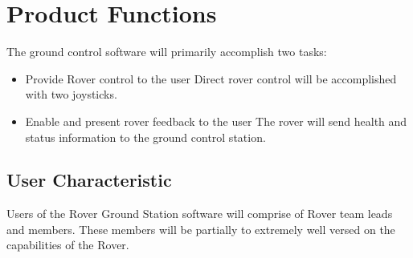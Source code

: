 \documentclass[onecolumn, draftclsnofoot, 10pt, compsoc]{IEEEtran}
\begin{document}
\section{Product Functions}
The ground control software will primarily accomplish two tasks:
\begin{itemize}
\item Provide Rover control to the user
Direct rover control will be accomplished with two joysticks.
\item Enable and present rover feedback to the user
The rover will send health and status information to the ground control station.
\end{itemize}
\subsection{User Characteristic}
Users of the Rover Ground Station software will comprise of Rover team leads and members. These members will be partially to extremely well versed on the capabilities of the Rover.
\end{document}
